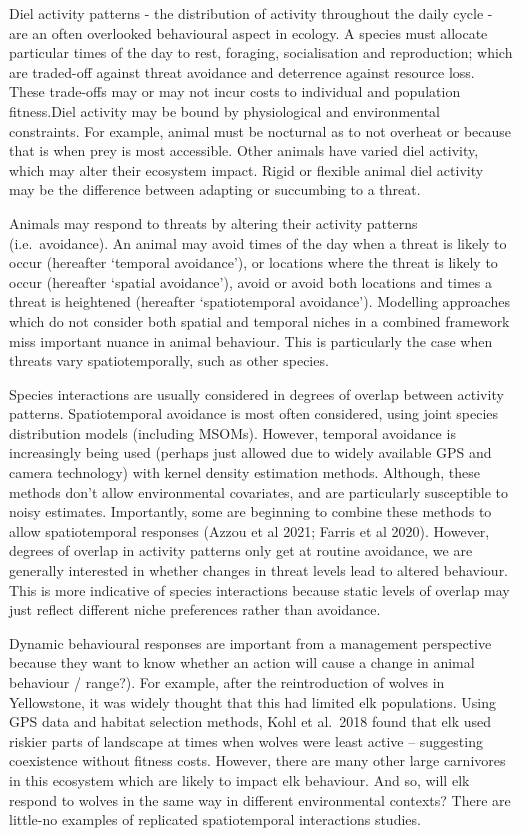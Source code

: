 \documentclass[]{elsarticle} %
\begin{document}
Diel activity patterns - the distribution of activity throughout the daily cycle - are an often overlooked behavioural aspect in ecology. A species must allocate particular times of the day to rest, foraging, socialisation and reproduction; which are traded-off against threat avoidance and deterrence against resource loss. These trade-offs may or may not incur costs to individual and population fitness.Diel activity may be bound by physiological and environmental constraints. For example, animal must be nocturnal as to not overheat or because that is when prey is most accessible. Other animals have varied diel activity, which may alter their ecosystem impact. Rigid or flexible animal diel activity may be the difference between adapting or succumbing to a threat.

Animals may respond to threats by altering their activity patterns (i.e.~avoidance). An animal may avoid times of the day when a threat is likely to occur (hereafter `temporal avoidance'), or locations where the threat is likely to occur (hereafter `spatial avoidance'), avoid or avoid both locations and times a threat is heightened (hereafter `spatiotemporal avoidance'). Modelling approaches which do not consider both spatial and temporal niches in a combined framework miss important nuance in animal behaviour. This is particularly the case when threats vary spatiotemporally, such as other species.

Species interactions are usually considered in degrees of overlap between activity patterns. Spatiotemporal avoidance is most often considered, using joint species distribution models (including MSOMs). However, temporal avoidance is increasingly being used (perhaps just allowed due to widely available GPS and camera technology) with kernel density estimation methods. Although, these methods don't allow environmental covariates, and are particularly susceptible to noisy estimates. Importantly, some are beginning to combine these methods to allow spatiotemporal responses (Azzou et al 2021; Farris et al 2020). However, degrees of overlap in activity patterns only get at routine avoidance, we are generally interested in whether changes in threat levels lead to altered behaviour. This is more indicative of species interactions because static levels of overlap may just reflect different niche preferences rather than avoidance.

Dynamic behavioural responses are important from a management perspective because they want to know whether an action will cause a change in animal behaviour / range?). For example, after the reintroduction of wolves in Yellowstone, it was widely thought that this had limited elk populations. Using GPS data and habitat selection methods, Kohl et al.~2018 found that elk used riskier parts of landscape at times when wolves were least active -- suggesting coexistence without fitness costs. However, there are many other large carnivores in this ecosystem which are likely to impact elk behaviour. And so, will elk respond to wolves in the same way in different environmental contexts? There are little-no examples of replicated spatiotemporal interactions studies.
\end{document}
